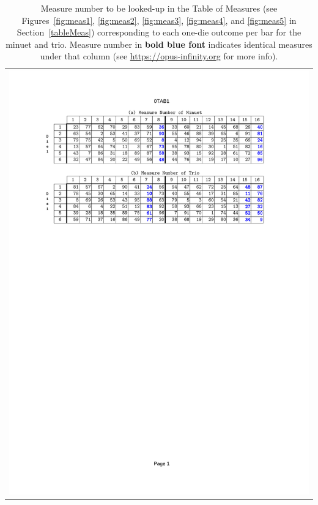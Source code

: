 \documentclass[a4paper,x11names,svgnames,10pt]{article}
\begin{document}
\begin{table}[H]
	\centering
	\begin{tabular}{c}
		\centering
		\includegraphics[clip=true,trim=0.90in 7.45in 1.25in 1.00in,scale=0.90]{012TAB}
	\end{tabular}
	\caption{Measure number to be looked-up in the Table of Measures (see Figures~\ref{fig:meas1}, \ref{fig:meas2}, \ref{fig:meas3}, \ref{fig:meas4}, and \ref{fig:meas5} in Section~\ref{tableMeas}) corresponding to each one-die outcome per bar for the minuet and trio. Measure number in {\bf\color{blue}bold blue font} indicates identical measures under that column (see  \href{https://opus-infinity.org/dice_games/kirnberger_menuet_trio/tables/}{https://opus-infinity.org} for more info).}
	\label{fig:0tab1}
\end{table}
\end{document}

